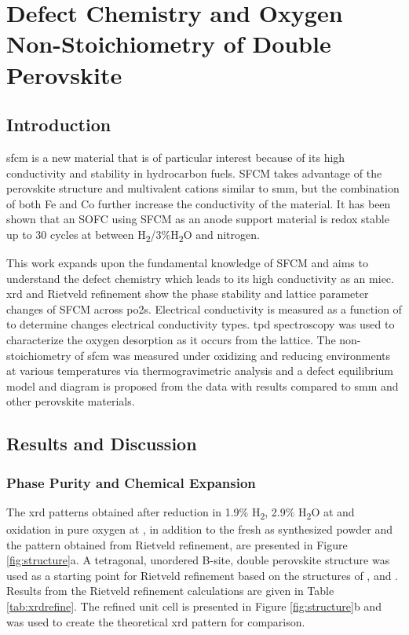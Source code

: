 
\chapter[Defect Chemistry and Oxygen Non-Stoichiometry of \ce{SrFe_{0.2}Co_{0.4}Mo_{0.4}O_{3-\delta}}]{Defect Chemistry and Oxygen Non-Stoichiometry of Double Perovskite }

\section{Introduction}
    \gls{sfcm} is a new material that is of particular interest because of its high conductivity and stability in hydrocarbon fuels.\cite{Pan}
    SFCM takes advantage of the perovskite structure and multivalent cations similar to \gls{smm}, but the combination of both Fe and Co further increase the conductivity of the material.
    It has been shown that an SOFC using SFCM as an anode support material is redox stable up to 30 cycles at  between H\textsubscript{2}/3\%H\textsubscript{2}O and nitrogen.\cite{Hussaina,Hussain}

    This work expands upon the fundamental knowledge of SFCM and aims to understand the defect chemistry which leads to its high conductivity as an \gls{miec}.
    \Gls{xrd} and Rietveld refinement show the phase stability and lattice parameter changes of SFCM across \glspl{po2}.
    Electrical conductivity is measured as a function of  to determine changes electrical conductivity types.
    \Gls{tpd} spectroscopy was used to characterize the oxygen desorption as it occurs from the lattice.
    The non-stoichiometry of \gls{sfcm} was measured under oxidizing and reducing environments at various temperatures via thermogravimetric analysis and a defect equilibrium model and diagram is proposed from the data with results compared to \gls{smm} and other perovskite materials.

\section{Results and Discussion}
    \subsection{Phase Purity and Chemical Expansion}
    The \gls{xrd} patterns obtained after reduction in 1.9\% H\textsubscript{2}, 2.9\% H\textsubscript{2}O at  and oxidation in pure oxygen at , in addition to the fresh as synthesized powder and the pattern obtained from Rietveld refinement, are presented in Figure \ref{fig:structure}a.
    A tetragonal, unordered B-site, double perovskite structure was used as a starting point for Rietveld refinement based on the structures of ,  and .\cite{Huang2009,Ritter2004}
    Results from the Rietveld refinement calculations are given in Table \ref{tab:xrdrefine}.
    The refined unit cell is presented in Figure \ref{fig:structure}b and was used to create the theoretical \gls{xrd} pattern for comparison.

